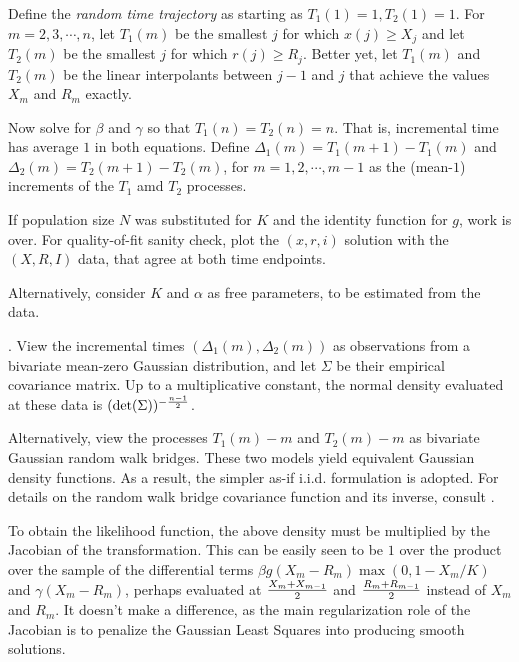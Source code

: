 \documentclass{article}
\begin{document}
\bigskip

Define the {\em random time trajectory} as starting as $T_1(1)=1, T_2(1)=1$. For $m=2,3,\cdots,n$, let $T_1(m)$ be the smallest $j$ for which $x(j) \ge X_j$ and let $T_2(m)$ be the smallest $j$ for which $r(j) \ge R_j$. Better yet, let $T_1(m)$ and $T_2(m)$ be the linear interpolants between $j-1$ and $j$ that achieve the values $X_m$ and $R_m$ exactly.

Now solve for $\beta$ and $\gamma$ so that $T_1(n)=T_2(n)=n$. That is, incremental time has average $1$ in both equations. Define $\Delta_1(m)=T_1(m+1)-T_1(m)$ and $\Delta_2(m)=T_2(m+1)-T_2(m)$, for $m=1, 2, \cdots,m-1$ as the (mean-$1$) increments of the $T_1$ amd $T_2$ processes.

\bigskip

If population size $N$ was substituted for $K$ and the identity function for $g$, work is over. For quality-of-fit sanity check, plot the $(x,r,i)$ solution with the $(X,R,I)$ data, that agree at both time endpoints.

Alternatively, consider $K$ and $\alpha$ as free parameters, to be estimated from the data.

\bigskip

. View the incremental times \linebreak $(\Delta_1(m),\Delta_2(m))$ as observations from a bivariate mean-zero Gaussian distribution, and let $\Sigma$ be their empirical covariance matrix. Up to a multiplicative constant, the normal density evaluated at these data is $(\det(\Sigma))^{-{{n-1} \over 2}}$.

Alternatively, view the processes $T_1(m)-m$ and $T_2(m)-m$ as bivariate Gaussian random walk bridges.
These two models yield equivalent Gaussian density functions. As a result, the simpler as-if i.i.d. formulation is adopted. For details on the random walk bridge covariance function and its inverse, consult \cite{Cuadras}.

To obtain the likelihood function, the above density must be multiplied by the Jacobian of the transformation. This can be easily seen to be $1$ over the product over the sample of the differential terms $\beta g(X_m-R_m)\max(0,1-X_m/K)$ and $\gamma (X_m-R_m)$, perhaps evaluated at
${{X_m+X_{m-1}} \over 2}$ and ${{R_m+R_{m-1}} \over 2}$ instead of $X_m$ and $R_m$. It doesn't make a difference, as the main regularization role of the Jacobian is to penalize the Gaussian Least Squares into producing smooth solutions.
\end{document}
